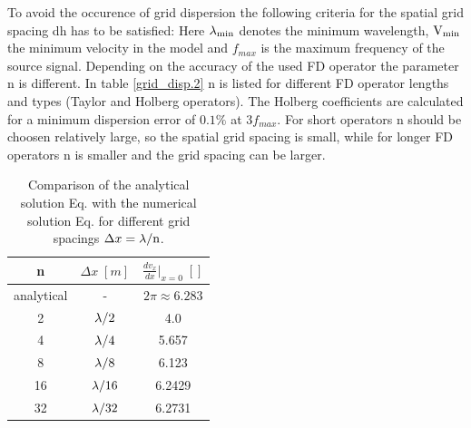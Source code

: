\documentclass[11pt,onecolumn,oneside]{article}
\begin{document}
To avoid the occurence of grid dispersion the following criteria for the spatial grid spacing dh has to be satisfied:
Here $\rm{\lambda_{min}}$ denotes the minimum wavelength, $\rm{V_{min}}$ the minimum velocity in the model and $f_{max}$ is the maximum
frequency of the source signal.  
Depending on the accuracy of the used FD operator the parameter n is different.  In table \ref{grid_disp.2} n is listed for different FD operator lengths 
and types (Taylor and Holberg operators). The Holberg coefficients are calculated for a minimum dispersion error of $0.1\%$ at $3 f_{max}$. For short operators n should be choosen relatively large, so the spatial grid spacing is small, while for longer FD operators n is smaller and the grid spacing can be larger. 
\begin{table}[hbt]
\begin{center}
\begin{tabular}{ccc}\hline \hline
n &  $\Delta x\; [m]$ & $\frac{d v_x}{d x}|_{x=0}\; []$ \\ \hline 
analytical & - & $2\pi \approx 6.283$ \\ 
2 & $\rm{\lambda}/2$ & 4.0 \\ 
4 & $\rm{\lambda}/4$ & 5.657 \\ 
8 & $\rm{\lambda}/8$ & 6.123 \\ 
16 & $\rm{\lambda}/16$ & 6.2429 \\ 
32 & $\rm{\lambda}/32$ & 6.2731\\ \hline \hline
\end{tabular}
\caption{\label{grid_disp.1} Comparison of the analytical solution Eq.  with the numerical solution Eq.  
for different grid spacings $\Delta x = \rm{\lambda /n}$.}
\end{center}
\end{table}
 
\end{document}
